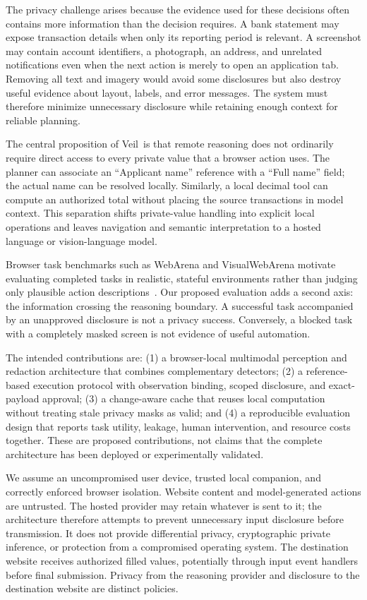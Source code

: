 \documentclass[conference]{IEEEtran}
\newcommand{\sys}{Veil}
\begin{document}
The privacy challenge arises because the evidence used for these decisions often contains more information than the decision requires. A bank statement may expose transaction details when only its reporting period is relevant. A screenshot may contain account identifiers, a photograph, an address, and unrelated notifications even when the next action is merely to open an application tab. Removing all text and imagery would avoid some disclosures but also destroy useful evidence about layout, labels, and error messages. The system must therefore minimize unnecessary disclosure while retaining enough context for reliable planning.

The central proposition of \sys\ is that remote reasoning does not ordinarily require direct access to every private value that a browser action uses. The planner can associate an ``Applicant name'' reference with a ``Full name'' field; the actual name can be resolved locally. Similarly, a local decimal tool can compute an authorized total without placing the source transactions in model context. This separation shifts private-value handling into explicit local operations and leaves navigation and semantic interpretation to a hosted language or vision-language model.

Browser task benchmarks such as WebArena and VisualWebArena motivate evaluating completed tasks in realistic, stateful environments rather than judging only plausible action descriptions~\cite{webarena,visualwebarena}. Our proposed evaluation adds a second axis: the information crossing the reasoning boundary. A successful task accompanied by an unapproved disclosure is not a privacy success. Conversely, a blocked task with a completely masked screen is not evidence of useful automation.

The intended contributions are: (1) a browser-local multimodal perception and redaction architecture that combines complementary detectors; (2) a reference-based execution protocol with observation binding, scoped disclosure, and exact-payload approval; (3) a change-aware cache that reuses local computation without treating stale privacy masks as valid; and (4) a reproducible evaluation design that reports task utility, leakage, human intervention, and resource costs together. These are proposed contributions, not claims that the complete architecture has been deployed or experimentally validated.

We assume an uncompromised user device, trusted local companion, and correctly enforced browser isolation. Website content and model-generated actions are untrusted. The hosted provider may retain whatever is sent to it; the architecture therefore attempts to prevent unnecessary input disclosure before transmission. It does not provide differential privacy, cryptographic private inference, or protection from a compromised operating system. The destination website receives authorized filled values, potentially through input event handlers before final submission. Privacy from the reasoning provider and disclosure to the destination website are distinct policies.
\end{document}
